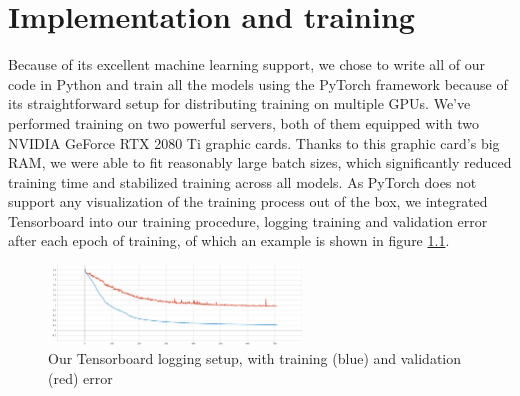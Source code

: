 \chapter{Implementation and training}
\label{kap:implementation}

Because of its excellent machine learning support, we chose to write all of our code in Python and train all the models using the PyTorch framework \cite{pytorch} because of its straightforward setup for distributing training on multiple GPUs.
\newline
We've performed training on two powerful servers, both of them equipped with two NVIDIA GeForce RTX 2080 Ti graphic cards. Thanks to this graphic card's big RAM, we were able to fit reasonably large batch sizes, which significantly reduced training time and stabilized training across all models.
\newline
As PyTorch does not support any visualization of the training process out of the box, we integrated Tensorboard into our training procedure, logging training and validation error after each epoch of training, of which an example is shown in figure \ref{fig:tesorboard}.
\begin{figure}[H]
    \centerline{\includegraphics[width=0.6\textwidth]{praca/images/Training-IRN.png}}
    \caption[Our Tensorboard logging setup]{Our Tensorboard logging setup, with training (blue) and validation (red) error}
    \label{fig:tesorboard}
\end{figure}
